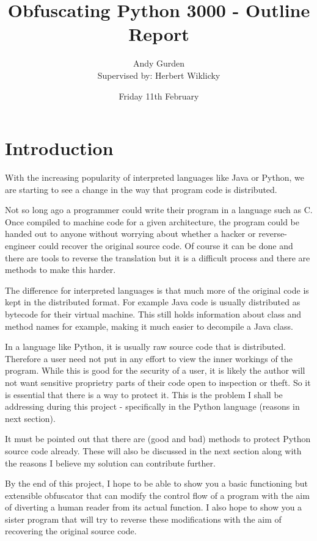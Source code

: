 \documentclass{report}
\title{Obfuscating Python 3000 - Outline Report}
\author{Andy Gurden\\Supervised by: Herbert Wiklicky}
\date{Friday 11th February}
\begin{document}
\maketitle

\section{Introduction}

With the increasing popularity of interpreted languages like Java or Python, we are starting
to see a change in the way that program code is distributed.

Not so long ago a programmer could write their program in a language such as C. Once compiled
to machine code for a given architecture, the program could be handed out to anyone without
worrying about whether a hacker or reverse-engineer could recover the original source code.
Of course it can be done and there are tools to reverse the translation\cite{cdecomp} but it
is a difficult process and there are methods to make this harder\cite{disres}.

The difference for interpreted languages is that much more of the original code is kept in the
distributed format. For example Java code is usually distributed as bytecode for their virtual
machine. This still holds information about class and method names for example\cite{classinfo},
making it much easier to decompile a Java class.

In a language like Python, it is usually raw source code that is distributed. Therefore a
user need not put in any effort to view the inner workings of the program. While this is good
for the security of a user\cite{noobf}, it is likely the author will not want sensitive
proprietry parts of their code open to inspection or theft. So it is essential that there is a
way to protect it. This is the problem I shall be addressing during this project - specifically
in the Python language (reasons in next section).

It must be pointed out that there are (good and bad) methods to protect Python source code already.
These will also be discussed in the next section along with the reasons I believe my solution can
contribute further.

By the end of this project, I hope to be able to show you a basic functioning but extensible obfuscator
that can modify the control flow of a program with the aim of diverting a human reader from its actual
function. I also hope to show you a sister program that will try to reverse these modifications with the
aim of recovering the original source code.
\end{document}
